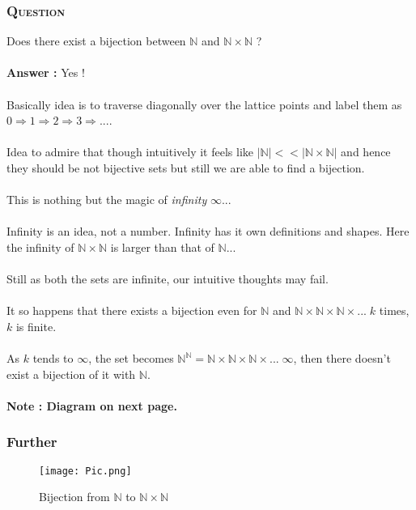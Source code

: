 \documentclass{article}
\begin{document}
\subsubsection*{\textsc{Question}}
Does there exist a bijection between $\mathbb{N}$ and $\mathbb{N} \times \mathbb{N}$ ? \\ \\
\textbf{Answer :} Yes !\\ \\
Basically idea is to traverse diagonally over the lattice points and label them as $0 \Rightarrow 1 \Rightarrow 2 \Rightarrow 3 \Rightarrow...$.
\\ \\
Idea to admire that though intuitively it feels like $|\mathbb{N}| << |\mathbb{N} \times \mathbb{N}|$ and hence they should be not bijective sets but still we are able to find a bijection.\\ \\
This is nothing but the magic of \textit{infinity} $\infty$... \\ \\
Infinity is an idea, not a number. Infinity has it own definitions and shapes. Here the infinity of $\mathbb{N} \times \mathbb{N}$ is larger than that of $\mathbb{N}$...\\ \\
Still as both the sets are infinite, our intuitive thoughts may fail. \\ \\
It so happens that there exists a bijection even for $\mathbb{N}$ and $\mathbb{N} \times \mathbb{N} \times \mathbb{N} \times ...\; k$ times, $k$ is finite.\\ \\
As $k$ tends to $\infty$, the set becomes $\mathbb{N}^{\mathbb{N}} = \mathbb{N} \times \mathbb{N} \times \mathbb{N} \times ... \; \infty$, then there doesn't exist a bijection of it with $\mathbb{N}$.\\ \\
\textbf{Note : Diagram on next page.}
\newpage
\subsubsection*{Further}
\begin{figure}
    \centering
    \texttt{[image: Pic.png]}
    \caption{Bijection from $\mathbb{N}$ to $\mathbb{N} \times \mathbb{N}$}
\end{figure}
\end{document}
